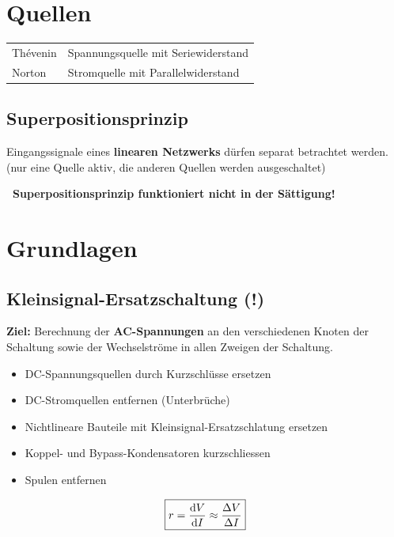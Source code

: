 \section{Quellen}

\begin{tabular}{ll}
    Thévenin    & Spannungsquelle mit Seriewiderstand \\
    Norton      & Stromquelle mit Parallelwiderstand
\end{tabular}

\vspace{0.1cm}



\subsection{Superpositionsprinzip}

Eingangssignale eines \textbf{linearen Netzwerks} dürfen separat betrachtet werden. \\
(nur eine Quelle aktiv, die anderen Quellen werden ausgeschaltet)

\vspace{0.1cm}

\textbf{ \textrightarrow\ Superpositionsprinzip funktioniert nicht in der Sättigung!}

\section{Grundlagen}


\subsection{Kleinsignal-Ersatzschaltung (!)}
\label{kleinsignal-ersatzschlatung}

\textbf{Ziel:} Berechnung der \textbf{AC-Spannungen} an den verschiedenen Knoten der Schaltung sowie der Wechselströme in allen 
Zweigen der Schaltung.

\vspace{0.1cm}
\begin{minipage}{0.75\columnwidth}
    \begin{itemize}
        \item DC-Spannungsquellen durch Kurzschlüsse ersetzen
        \item DC-Stromquellen entfernen (Unterbrüche)
        \item Nichtlineare Bauteile mit Kleinsignal-Ersatzschlatung ersetzen
        \item Koppel- und Bypass-Kondensatoren kurzschliessen
        \item Spulen entfernen
    \end{itemize}
\end{minipage}
\begin{minipage}{0.2\columnwidth}
    \[\boxed{r = \frac{\mathop{} \! \mathrm{d} V}{\mathop{} \! \mathrm{d} I} \approx \frac{\Delta V}{\Delta I}}\]

\end{minipage}


